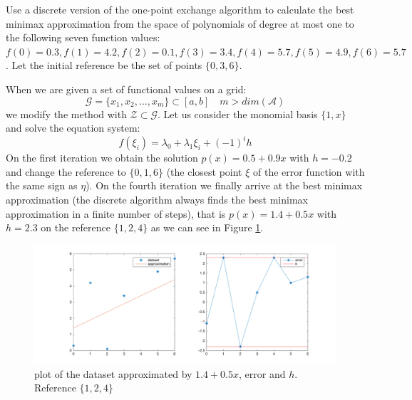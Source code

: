 \begin{problem}
Use a discrete version of the one-point exchange algorithm to calculate the best minimax approximation from the space of polynomials of degree at most one to the following seven function values: $f(0)=0.3, f(1) = 4.2, f(2) = 0.1, f(3) = 3.4, f(4) = 5.7, f(5) = 4.9, f(6) = 5.7$. Let the initial reference be the set of points $\{0, 3, 6\}$.
\end{problem}

\begin{solution}
When we are given a set of functional values on a grid:
\begin{equation*}
\mathcal{G} = \{x_1,x_2,\ldots,x_m\} \subset [a,b] \quad m>dim(\mathcal{A})
\end{equation*}
we modify the method with $\mathcal{Z} \subset \mathcal{G}$. Let us consider the monomial basis $\{1,x\}$ and solve the equation system:
\begin{equation*}
f(\xi_i)=\lambda_0+\lambda_1\xi_i + (-1)^ih
\end{equation*}
On the first iteration we obtain the solution $p(x) = 0.5 + 0.9x$ with $h=-0.2$ and change the reference to $\{0, 1, 6\}$ (the closest point $\xi$ of the error function with the same sign as $\eta$). On the fourth iteration we finally arrive at the best minimax approximation (the discrete algorithm always finds the best minimax approximation in a finite number of steps), that is $p(x) = 1.4 + 0.5x$ with $h = 2.3$ on the reference $\{1, 2, 4\}$ as we can see in Figure \ref{discreteminimax}.
\begin{figure}[h]
\centering 
\includegraphics[scale = 0.25]{hwk5t3.png}
\caption{plot of the dataset approximated by $1.4 + 0.5x$, error and $h$. Reference $\{1,2,4\}$}
\label{discreteminimax}
\end{figure}
\end{solution}

